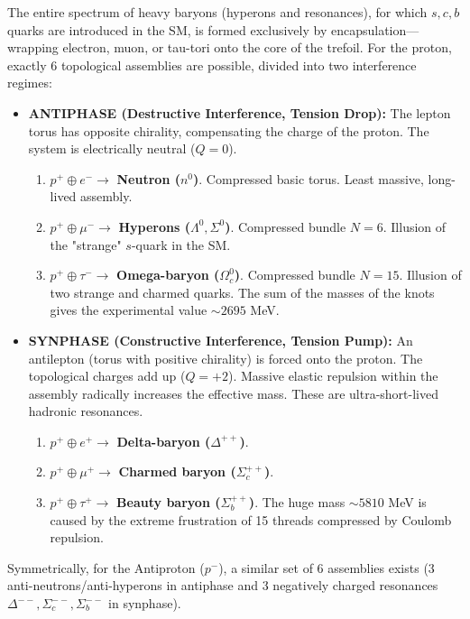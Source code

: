 \documentclass[11pt,a4paper]{article}
\begin{document}
	The entire spectrum of heavy baryons (hyperons and resonances), for which $s, c, b$ quarks are introduced in the SM, is formed exclusively by encapsulation—wrapping electron, muon, or tau-tori onto the core of the trefoil. For the proton, exactly 6 topological assemblies are possible, divided into two interference regimes:
	\begin{itemize}
		\item \textbf{ANTIPHASE (Destructive Interference, Tension Drop):} The lepton torus has opposite chirality, compensating the charge of the proton. The system is electrically neutral ($Q=0$).
		\begin{enumerate}
			\item $p^+ \oplus e^- \longrightarrow$ \textbf{Neutron ($n^0$)}. Compressed basic torus. Least massive, long-lived assembly.
			\item $p^+ \oplus \mu^- \longrightarrow$ \textbf{Hyperons ($\Lambda^0, \Sigma^0$)}. Compressed bundle $N=6$. Illusion of the "strange" $s$-quark in the SM.
			\item $p^+ \oplus \tau^- \longrightarrow$ \textbf{Omega-baryon ($\Omega_c^0$)}. Compressed bundle $N=15$. Illusion of two strange and charmed quarks. The sum of the masses of the knots gives the experimental value $\sim 2695$ MeV.
		\end{enumerate}
		
		\item \textbf{SYNPHASE (Constructive Interference, Tension Pump):} An antilepton (torus with positive chirality) is forced onto the proton. The topological charges add up ($Q=+2$). Massive elastic repulsion within the assembly radically increases the effective mass. These are ultra-short-lived hadronic resonances.
		\begin{enumerate}
			\item $p^+ \oplus e^+ \longrightarrow$ \textbf{Delta-baryon ($\Delta^{++}$)}.
			\item $p^+ \oplus \mu^+ \longrightarrow$ \textbf{Charmed baryon ($\Sigma_c^{++}$)}.
			\item $p^+ \oplus \tau^+ \longrightarrow$ \textbf{Beauty baryon ($\Sigma_b^{++}$)}. The huge mass $\sim 5810$ MeV is caused by the extreme frustration of 15 threads compressed by Coulomb repulsion.
		\end{enumerate}
	\end{itemize}
	
	Symmetrically, for the Antiproton ($p^-$), a similar set of 6 assemblies exists (3 anti-neutrons/anti-hyperons in antiphase and 3 negatively charged resonances $\Delta^{--}, \Sigma_c^{--}, \Sigma_b^{--}$ in synphase). 
	
\end{document}
